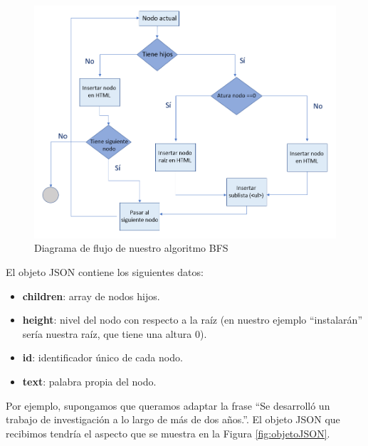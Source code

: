 \begin{itemize}
\begin{figure}[h!]
		
		\includegraphics[scale=0.9]{Imagenes/Figuras/diagramaBFS}
		
		
		\caption{Diagrama de flujo de nuestro algoritmo BFS}
		\label{fig:diagramaBFS}
	\end{figure}
	
	
	El objeto JSON contiene los siguientes datos:
		\begin{itemize}
		\item \textbf{children}: array de nodos hijos.
		\item \textbf{height}: nivel del nodo con respecto a la raíz (en nuestro ejemplo ``instalarán'' sería nuestra raíz, que tiene una altura 0).
		\item \textbf{id}: identificador único de cada nodo.
		\item \textbf{text}: palabra propia del nodo.
	\end{itemize}
	Por ejemplo, supongamos que queramos adaptar la frase ``Se desarrolló un trabajo de investigación a lo largo de más de dos años.''. El objeto JSON que recibimos tendría el aspecto que se muestra en la Figura \ref{fig:objetoJSON}. 

\begin{figure}[h!]
	\centering
	

\end{figure}
\end{itemize}
